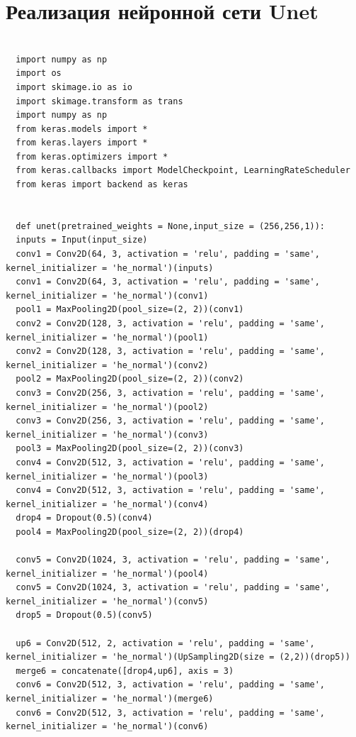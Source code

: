 \documentclass[times]{itmo-student-thesis}
\begin{document}
  \chapter{Реализация нейронной сети Unet}
  \begin{lstlisting}[caption={Реализация сети Unet},label={lstX}]
  
  import numpy as np 
  import os
  import skimage.io as io
  import skimage.transform as trans
  import numpy as np
  from keras.models import *
  from keras.layers import *
  from keras.optimizers import *
  from keras.callbacks import ModelCheckpoint, LearningRateScheduler
  from keras import backend as keras
  
  
  def unet(pretrained_weights = None,input_size = (256,256,1)):
  inputs = Input(input_size)
  conv1 = Conv2D(64, 3, activation = 'relu', padding = 'same', kernel_initializer = 'he_normal')(inputs)
  conv1 = Conv2D(64, 3, activation = 'relu', padding = 'same', kernel_initializer = 'he_normal')(conv1)
  pool1 = MaxPooling2D(pool_size=(2, 2))(conv1)
  conv2 = Conv2D(128, 3, activation = 'relu', padding = 'same', kernel_initializer = 'he_normal')(pool1)
  conv2 = Conv2D(128, 3, activation = 'relu', padding = 'same', kernel_initializer = 'he_normal')(conv2)
  pool2 = MaxPooling2D(pool_size=(2, 2))(conv2)
  conv3 = Conv2D(256, 3, activation = 'relu', padding = 'same', kernel_initializer = 'he_normal')(pool2)
  conv3 = Conv2D(256, 3, activation = 'relu', padding = 'same', kernel_initializer = 'he_normal')(conv3)
  pool3 = MaxPooling2D(pool_size=(2, 2))(conv3)
  conv4 = Conv2D(512, 3, activation = 'relu', padding = 'same', kernel_initializer = 'he_normal')(pool3)
  conv4 = Conv2D(512, 3, activation = 'relu', padding = 'same', kernel_initializer = 'he_normal')(conv4)
  drop4 = Dropout(0.5)(conv4)
  pool4 = MaxPooling2D(pool_size=(2, 2))(drop4)
  
  conv5 = Conv2D(1024, 3, activation = 'relu', padding = 'same', kernel_initializer = 'he_normal')(pool4)
  conv5 = Conv2D(1024, 3, activation = 'relu', padding = 'same', kernel_initializer = 'he_normal')(conv5)
  drop5 = Dropout(0.5)(conv5)
  
  up6 = Conv2D(512, 2, activation = 'relu', padding = 'same', kernel_initializer = 'he_normal')(UpSampling2D(size = (2,2))(drop5))
  merge6 = concatenate([drop4,up6], axis = 3)
  conv6 = Conv2D(512, 3, activation = 'relu', padding = 'same', kernel_initializer = 'he_normal')(merge6)
  conv6 = Conv2D(512, 3, activation = 'relu', padding = 'same', kernel_initializer = 'he_normal')(conv6)
  

\end{lstlisting}
\end{document}
